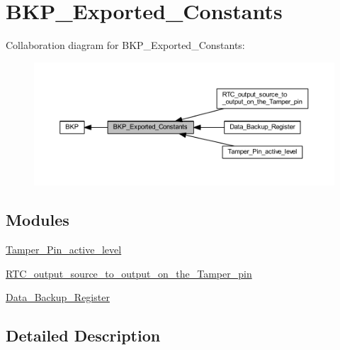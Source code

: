 \hypertarget{group___b_k_p___exported___constants}{}\section{B\+K\+P\+\_\+\+Exported\+\_\+\+Constants}
\label{group___b_k_p___exported___constants}
Collaboration diagram for B\+K\+P\+\_\+\+Exported\+\_\+\+Constants\+:
\nopagebreak
\begin{figure}[H]
\begin{center}
\leavevmode
\includegraphics[width=350pt]{group___b_k_p___exported___constants}
\end{center}
\end{figure}
\subsection*{Modules}
\begin{DoxyCompactItemize}
\item 
\hyperlink{group___tamper___pin__active__level}{Tamper\+\_\+\+Pin\+\_\+active\+\_\+level}
\item 
\hyperlink{group___r_t_c__output__source__to__output__on__the___tamper__pin}{R\+T\+C\+\_\+output\+\_\+source\+\_\+to\+\_\+output\+\_\+on\+\_\+the\+\_\+\+Tamper\+\_\+pin}
\item 
\hyperlink{group___data___backup___register}{Data\+\_\+\+Backup\+\_\+\+Register}
\end{DoxyCompactItemize}


\subsection{Detailed Description}

